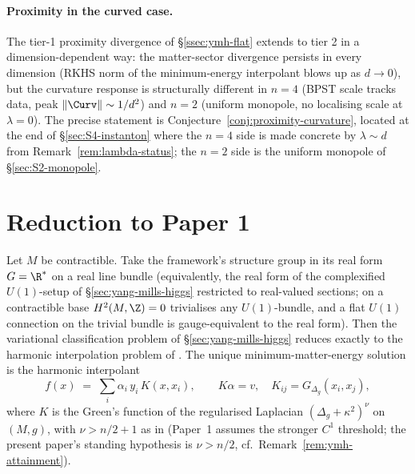 \paragraph{Proximity in the curved case.} The tier-1 proximity
divergence of \S\ref{ssec:ymh-flat} extends to tier 2 in a
dimension-dependent way: the matter-sector divergence persists in
every dimension (RKHS norm of the minimum-energy interpolant blows
up as $d\to 0$), but the curvature response is
structurally different in $n=4$ (BPST scale tracks data, peak
$\|\Curv\|\sim 1/d^2$) and $n=2$ (uniform monopole, no localising
scale at $\lambda=0$). The precise statement is
Conjecture~\ref{conj:proximity-curvature}, located at the end of
\S\ref{sec:S4-instanton} where the $n=4$ side is made concrete by
$\lambda\sim d$ from Remark~\ref{rem:lambda-status}; the $n=2$ side is
the uniform monopole of \S\ref{sec:S2-monopole}.

\section{Reduction to Paper 1}
\label{sec:reduction-paper1}

\begin{proposition}\label{prop:reduction-paper1}
Let $M$ be contractible. Take the framework's structure group in
its real form $G=\R^*$ on a real line bundle (equivalently, the real
form of the complexified $U(1)$-setup of \S\ref{sec:yang-mills-higgs}
restricted to real-valued sections; on a contractible base
$H^2(M,\Z)=0$ trivialises any $U(1)$-bundle, and a flat $U(1)$
connection on the trivial bundle is gauge-equivalent to the real
form). Then the variational classification problem of
\S\ref{sec:yang-mills-higgs} reduces exactly to the harmonic
interpolation problem of \cite[Theorem~13.3]{Vasii2026Paper1}. The
unique minimum-matter-energy solution is the harmonic interpolant
\[
  f(x)\;=\;\sum_i \alpha_i\, y_i\, K(x,x_i),
  \qquad K\alpha = v,\quad K_{ij} = G_{\Delta_g}(x_i,x_j),
\]
where $K$ is the Green's function of the regularised Laplacian
$(\Delta_g+\kappa^2)^\nu$ on $(M,g)$, with $\nu>n/2+1$ as in
\cite[Theorem~13.3]{Vasii2026Paper1} (Paper~1 assumes the stronger
$C^1$ threshold; the present paper's standing hypothesis is
$\nu>n/2$, cf.\ Remark~\ref{rem:ymh-attainment}).
\end{proposition}

